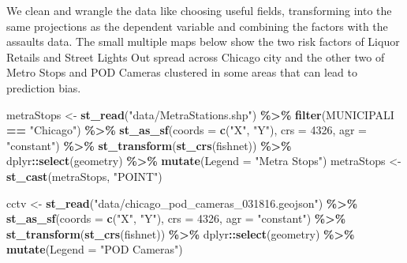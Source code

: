 \documentclass[
]{article}
\newenvironment{Shaded}{\begin{snugshade}}{\end{snugshade}}
\newcommand{\AttributeTok}[1]{\textcolor[rgb]{0.13,0.29,0.53}{#1}}
\newcommand{\DecValTok}[1]{\textcolor[rgb]{0.00,0.00,0.81}{#1}}
\newcommand{\FunctionTok}[1]{\textcolor[rgb]{0.13,0.29,0.53}{\textbf{#1}}}
\newcommand{\NormalTok}[1]{#1}
\newcommand{\OtherTok}[1]{\textcolor[rgb]{0.56,0.35,0.01}{#1}}
\newcommand{\SpecialCharTok}[1]{\textcolor[rgb]{0.81,0.36,0.00}{\textbf{#1}}}
\newcommand{\StringTok}[1]{\textcolor[rgb]{0.31,0.60,0.02}{#1}}
\begin{document}
We clean and wrangle the data like choosing useful fields, transforming
into the same projections as the dependent variable and combining the
factors with the assaults data. The small multiple maps below show the
two risk factors of Liquor Retails and Street Lights Out spread across
Chicago city and the other two of Metro Stops and POD Cameras clustered
in some areas that can lead to prediction bias.

\begin{Shaded}
\begin{Highlighting}[]
\NormalTok{metraStops }\OtherTok{\textless{}{-}} \FunctionTok{st\_read}\NormalTok{(}\StringTok{"data/MetraStations.shp"}\NormalTok{) }\SpecialCharTok{\%\textgreater{}\%}
                \FunctionTok{filter}\NormalTok{(MUNICIPALI }\SpecialCharTok{==} \StringTok{"Chicago"}\NormalTok{) }\SpecialCharTok{\%\textgreater{}\%}
                \FunctionTok{st\_as\_sf}\NormalTok{(}\AttributeTok{coords =} \FunctionTok{c}\NormalTok{(}\StringTok{"X"}\NormalTok{, }\StringTok{"Y"}\NormalTok{), }\AttributeTok{crs =} \DecValTok{4326}\NormalTok{, }\AttributeTok{agr =} \StringTok{"constant"}\NormalTok{) }\SpecialCharTok{\%\textgreater{}\%}
                \FunctionTok{st\_transform}\NormalTok{(}\FunctionTok{st\_crs}\NormalTok{(fishnet)) }\SpecialCharTok{\%\textgreater{}\%}
\NormalTok{                dplyr}\SpecialCharTok{::}\FunctionTok{select}\NormalTok{(geometry) }\SpecialCharTok{\%\textgreater{}\%}
                \FunctionTok{mutate}\NormalTok{(}\AttributeTok{Legend =} \StringTok{"Metra Stops"}\NormalTok{)}
\NormalTok{metraStops }\OtherTok{\textless{}{-}}  \FunctionTok{st\_cast}\NormalTok{(metraStops, }\StringTok{"POINT"}\NormalTok{)}

\NormalTok{cctv }\OtherTok{\textless{}{-}} \FunctionTok{st\_read}\NormalTok{(}\StringTok{"data/chicago\_pod\_cameras\_031816.geojson"}\NormalTok{) }\SpecialCharTok{\%\textgreater{}\%}
          \FunctionTok{st\_as\_sf}\NormalTok{(}\AttributeTok{coords =} \FunctionTok{c}\NormalTok{(}\StringTok{"X"}\NormalTok{, }\StringTok{"Y"}\NormalTok{), }\AttributeTok{crs =} \DecValTok{4326}\NormalTok{, }\AttributeTok{agr =} \StringTok{"constant"}\NormalTok{) }\SpecialCharTok{\%\textgreater{}\%}
          \FunctionTok{st\_transform}\NormalTok{(}\FunctionTok{st\_crs}\NormalTok{(fishnet)) }\SpecialCharTok{\%\textgreater{}\%}
\NormalTok{          dplyr}\SpecialCharTok{::}\FunctionTok{select}\NormalTok{(geometry) }\SpecialCharTok{\%\textgreater{}\%}
          \FunctionTok{mutate}\NormalTok{(}\AttributeTok{Legend =} \StringTok{"POD Cameras"}\NormalTok{)}


\end{Highlighting}
\end{Shaded}
\end{document}
